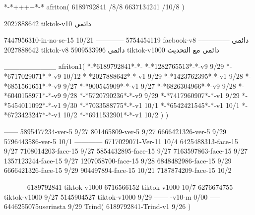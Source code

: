 *-*++++*-*
afriton(
6189792841 /8/8
6637134241 /10/8
)

2027888642 tiktok-v10
دائمي


7447956310-in-no-se-15 10/21
------------
5754454119 facbook-v8
دائمي
--------------
2027888642 tiktok-v8
دائمي
5909533996 tiktok-v1000
دائمي مع التحديث

__________
afriton1(
*-*6189792841*-*-
*-*1282765513*-*-v9 9/29
*-*6717029071*-*-v9 10/12
*-*2027888642*-*-v1 9/29
*-*1423762395*-*-v1 9/28
*-*6851561651*-*-v9 9/27
*-*900545909*-*-v1 9/27
*-*6826304966*-*-v9 9/28
*-*6040158971*-*-v9 9/28
*-*5720790236*-*-v9 9/29
*-*7417960907*-*-v1 9/29
*-*5454011092*-*-v1 9/30
*-*7033588775*-*-v1 10/1
*-*6542421545*-*-v1 10/1
*-*6723423247*-*-v1 10/2
*-*6911532901*-*-v1 10/2
)
)

------
5895477234-ver-5 9/27
801465809-ver-5 9/27
6666421326-ver-5 9/29
5796443586-ver-5 10/1
------------
6717029071-Ver-11
10/4
6425488313-face-15 9/27
7108014203-face-15 9/27
5854432895-face-15 9/27
7163597863-face-15 9/27
1357123244-face-15 9/27
1207058700-face-15 9/28
6848482986-face-15 9/29
6666421326-face-15 9/29
904497894-face-15 10/21
7187874209-face-15 10/2

---------
6189792841 tiktok-v1000
6716566152 tiktok-v1000
10/7
6276674755 tiktok-v1000
9/27
5145904527 tiktok-v1000
9/29
------
-v10-m 0/00
-----
6446255075userinsta 9/29
Trind(
6189792841-Trind-v1 9/26
)
